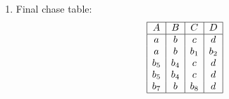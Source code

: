 \begin{example}
\begin{enumerate}
\begin{itemize}
        Updated table after $C \rightarrow D$:
        \begin{equation}
          \begin{array}{|c|c|c|c|}
          \hline
          A & B & C & D \\
          \hline
          a & b & c & d \\
          a & b & b_1 & b_2 \\
          b_3 & b_4 & c & d \\
          b_5 & b_4 & c & d \\
          b_7 & b & b_8 & d \\
          \hline
          \end{array}
        \end{equation}

        \item Apply $AD \rightarrow C$:
            \begin{itemize}
            \item Where $A$ and $D$ match, $C$ must match
            \item Row 1 and 2: $A=a$ but different $D$, no change
            \end{itemize}

        \item Apply $BC \rightarrow A$:
            \begin{itemize}
            \item Where $B$ and $C$ match, $A$ must match
            \item Row 3 and 4: same $B$ ($b_4$) and $C$ ($c$), so $A$ must match
            \item $b_3$ becomes $b_5$
            \end{itemize}
    \end{itemize}

    \item Final chase table:
        \begin{equation}
          \begin{array}{|c|c|c|c|}
          \hline
          A & B & C & D \\
          \hline
          a & b & c & d \\
          a & b & b_1 & b_2 \\
          b_5 & b_4 & c & d \\
          b_5 & b_4 & c & d \\
          b_7 & b & b_8 & d \\
          \hline
          \end{array}
        \end{equation}


\end{enumerate}
\end{example}
